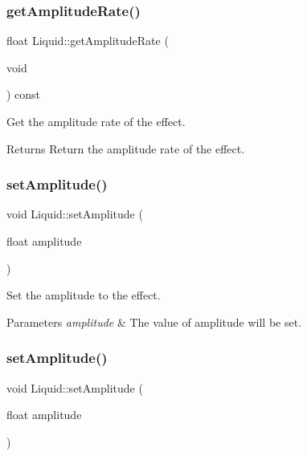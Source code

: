 \subsubsection{\texorpdfstring{get\+Amplitude\+Rate()}{getAmplitudeRate()}\hspace{0.1cm}{\footnotesize\ttfamily [2/2]}}
{\footnotesize\ttfamily float Liquid\+::get\+Amplitude\+Rate (\begin{DoxyParamCaption}\item[{void}]{ }\end{DoxyParamCaption}) const\hspace{0.3cm}{\ttfamily [inline]}}



Get the amplitude rate of the effect. 

\begin{DoxyReturn}{Returns}
Return the amplitude rate of the effect. 
\end{DoxyReturn}
\mbox{\label{classLiquid_a9290cc78546a4789c799f0c3a207fe24}} 
\subsubsection{\texorpdfstring{set\+Amplitude()}{setAmplitude()}\hspace{0.1cm}{\footnotesize\ttfamily [1/2]}}
{\footnotesize\ttfamily void Liquid\+::set\+Amplitude (\begin{DoxyParamCaption}\item[{float}]{amplitude }\end{DoxyParamCaption})\hspace{0.3cm}{\ttfamily [inline]}}



Set the amplitude to the effect. 


\begin{DoxyParams}{Parameters}
{\em amplitude} & The value of amplitude will be set. \\
\hline
\end{DoxyParams}
\mbox{\label{classLiquid_a9290cc78546a4789c799f0c3a207fe24}} 
\subsubsection{\texorpdfstring{set\+Amplitude()}{setAmplitude()}\hspace{0.1cm}{\footnotesize\ttfamily [2/2]}}
{\footnotesize\ttfamily void Liquid\+::set\+Amplitude (\begin{DoxyParamCaption}\item[{float}]{amplitude }\end{DoxyParamCaption})\hspace{0.3cm}{\ttfamily [inline]}}



